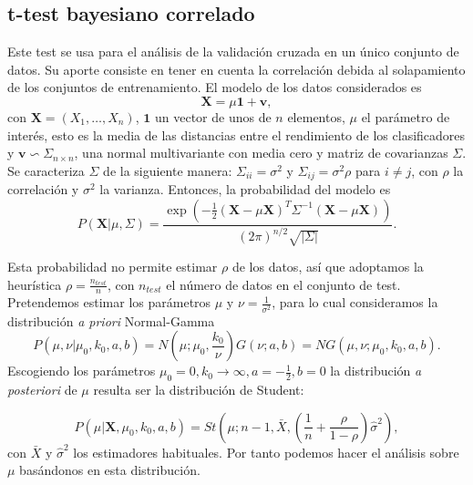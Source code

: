 \subsection{t-test bayesiano correlado}
	\label{ssec:bayes-ttest}
	Este test se usa para el análisis de la validación
cruzada en un único conjunto de datos. Su aporte consiste en 
tener en cuenta la correlación debida al solapamiento de los 
conjuntos de entrenamiento. El modelo de los datos 
considerados es
	\[ \mathbf{X} = \mu \mathbf{1} + \mathbf{v}, \]
	con $\mathbf{X} = (X_1, \dots, X_n)$, $\mathbf{1}$ un 
vector de unos de $n$ elementos, $\mu$ el parámetro de
interés, esto es la media de las distancias entre el 
rendimiento de los clasificadores y $\mathbf{v} \backsim 
\Sigma_{n \times n}$, una normal multivariante con
media cero y matriz de covarianzas $\Sigma$. Se caracteriza
$\Sigma$ de la siguiente manera: $\Sigma_{ii} = \sigma^2$
y $\Sigma_{ij} = \sigma^2 \rho$ para $i \neq j$, con $\rho$
la correlación y $\sigma^2$ la varianza. Entonces,
la probabilidad del modelo es 
	\[ 
		P(\mathbf{X} | \mu, \Sigma) = 
		\frac{\exp\left(
				-\frac{1}{2}
				(\mathbf{X}-\mu\mathbf{X})^T
				\Sigma^{-1}
				(\mathbf{X}-\mu\mathbf{X})
			\right)}
		{(2\pi)^{n/2} \sqrt{|\Sigma|}}.
	\]

	Esta probabilidad no permite estimar $\rho$ de los datos, 
así que adoptamos la heurística $\rho = \frac{n_{test}}{n}$,
con $n_{test}$ el número de datos en el conjunto de test.
Pretendemos estimar los parámetros $\mu$ y $\nu = 
\frac{1}{\sigma^2}$, para lo cual consideramos la 
distribución \textit{a priori} Normal-Gamma
	\[
		P(\mu, \nu | \mu_0, k_0, a, b) =
			N\left(\mu; \mu_0, \frac{k_0}{\nu} \right)
			G(\nu; a, b) = 
			NG(\mu, \nu ; \mu_0, k_0, a, b).
	\]
	Escogiendo los parámetros $\mu_0 = 0, k_0 \rightarrow 
\infty, a = -\frac{1}{2}, b=0$ la distribución \textit{a 
posteriori} de $\mu$ resulta ser la distribución de Student:
	
	\[
		P(\mu | \mathbf{X}, \mu_0, k_0, a, b) =
			St \left(
					\mu; n-1 , \bar{X},
					\left( \frac{1}{n} + 
							\frac{\rho}{1 - \rho} 
					\right) \hat{\sigma}^2
			   \right),
	\]
	con $\bar{X}$ y $\hat{\sigma}^2$ los estimadores 
habituales. Por tanto podemos hacer el análisis sobre $\mu$ 
basándonos en esta distribución.


